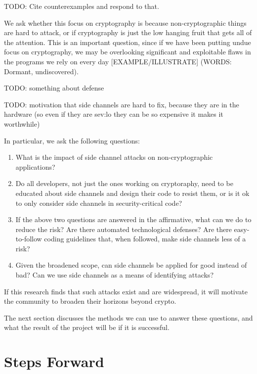 \documentclass{acm_proc_article-sp}
\begin{document}
TODO: Cite counterexamples and respond to that.

We ask whether this focus on cryptography is because non-cryptographic things
are hard to attack, or if cryptography is just the low hanging fruit that gets
all of the attention. This is an important question, since if we have been
putting undue focus on cryptography, we may be overlooking significant and
exploitable flaws in the programs we rely on every day [EXAMPLE/ILLUSTRATE]
(WORDS: Dormant, undiscovered).

TODO: something about defense

TODO: motivation that side channels are hard to fix, because they are in the
hardware (so even if they are sev:lo they can be so expensive it makes it
worthwhile)

In particular, we ask the following questions:

\begin{enumerate}
\item What is the impact of side channel attacks on non-cryptographic
      applications?

\item Do all developers, not just the ones working on cryptoraphy, need to be
      educated about side channels and design their code to resist them, or is
      it ok to only consider side channels in security-critical code?

\item If the above two questions are answered in the affirmative, what can we do
      to reduce the risk? Are there automated technological defenses? Are there
      easy-to-follow coding guidelines that, when followed, make side channels
      less of a risk?

\item Given the broadened scope, can side channels be applied for good instead
      of bad? Can we use side channels as a means of identifying attacks?
\end{enumerate}

If this research finds that such attacks exist and are widespread, it will
motivate the community to broaden their horizons beyond crypto.

The next section discusses the methods we can use to answer these questions, and
what the result of the project will be if it is successful.

\section{Steps Forward}
\end{document}
